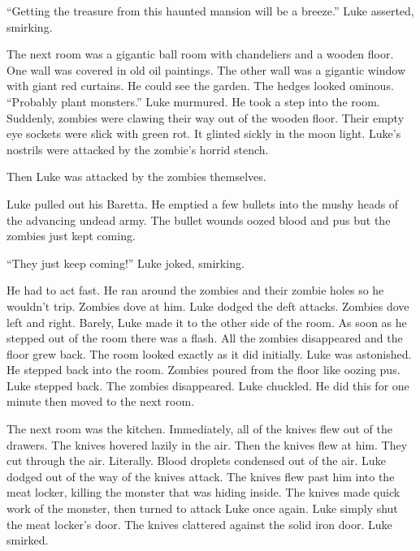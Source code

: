 ``Getting the treasure from this haunted mansion will be a
breeze.'' Luke asserted, smirking.



The next room was a gigantic ball room with chandeliers and a
wooden floor. One wall was covered in old oil paintings. The other
wall was a gigantic window with giant red curtains. He could see
the garden. The hedges looked ominous. ``Probably plant
monsters.'' Luke murmured. He took a step into the room.
Suddenly, zombies were clawing their way out of the wooden floor.
Their empty eye sockets were slick with green rot. It glinted
sickly in the moon light. Luke's nostrils were attacked by
the zombie's horrid stench.



Then Luke was attacked by the zombies themselves.



Luke pulled out his Baretta. He emptied a few bullets into the
mushy heads of the advancing undead army. The bullet wounds oozed
blood and pus but the zombies just kept coming.



``They just keep coming!'' Luke joked, smirking.



He had to act fast. He ran around the zombies and their zombie
holes so he wouldn't trip. Zombies dove at him. Luke dodged
the deft attacks. Zombies dove left and right. Barely, Luke made it
to the other side of the room. As soon as he stepped out of the
room there was a flash. All the zombies disappeared and the floor
grew back. The room looked exactly as it did initially. Luke was
astonished. He stepped back into the room. Zombies poured from the
floor like oozing pus. Luke stepped back. The zombies disappeared.
Luke chuckled. He did this for one minute then moved to the next
room.



The next room was the kitchen. Immediately, all of the knives flew
out of the drawers. The knives hovered lazily in the air. Then the
knives flew at him. They cut through the air. Literally. Blood
droplets condensed out of the air. Luke dodged out of the way of
the knives attack. The knives flew past him into the meat locker,
killing the monster that was hiding inside. The knives made quick
work of the monster, then turned to attack Luke once again. Luke
simply shut the meat locker's door. The knives clattered
against the solid iron door. Luke smirked.



